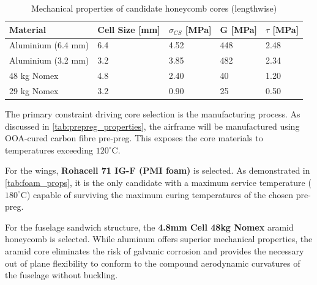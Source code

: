 \begin{table}[H]
    \centering
    \caption{Mechanical properties of candidate honeycomb cores (lengthwise)
    }
    \label{tab:honeycomb_props}
    \begin{tabular}{|p{3.5cm}|p{2.4cm}|p{2cm}|p{2cm}|p{2cm}|}
        \hline
        \textbf{Material} &
        \textbf{Cell Size [mm]} &
        \textbf{$\sigma_{CS}$ [MPa]} &
        \textbf{G [MPa]} &
        \textbf{$\tau$ [MPa]} \\
        \hline\hline
        Aluminium (6.4 mm)
        & 6.4 & 4.52 & 448 & 2.48 \\
        \hline
        Aluminium (3.2 mm)
        & 3.2 & 3.85 & 482 & 2.34 \\
        \hline
        48 kg Nomex
        & 4.8 & 2.40 & 40 & 1.20 \\
        \hline
        29 kg Nomex
        & 3.2 & 0.90 & 25 & 0.50 \\
        \hline
    \end{tabular}
\end{table}

The primary constraint driving core selection is the manufacturing process. As discussed in \autoref{tab:prepreg_properties}, the airframe will be manufactured using OOA-cured carbon fibre pre-preg. This exposes the core materials to temperatures exceeding $120^\circ$C. 

For the wings, \textbf{Rohacell 71 IG-F (PMI foam)} is selected. As demonstrated in \autoref{tab:foam_props}, it is the only candidate with a maximum service temperature ($180^\circ$C) capable of surviving the maximum curing temperatures of the chosen pre-preg. %

For the fuselage sandwich structure, the \textbf{4.8mm Cell 48kg Nomex} aramid honeycomb is selected. While aluminum offers superior mechanical properties, the aramid core eliminates the risk of galvanic corrosion and provides the necessary out of plane flexibility to conform to the compound aerodynamic curvatures of the fuselage without buckling. %


